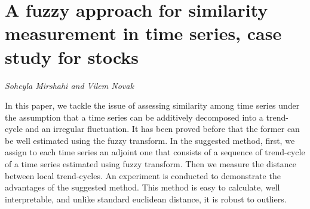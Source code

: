 \documentclass[../booklet.tex]{subfiles}
\begin{document}
\section[A fuzzy approach for similarity measurement in time series, case study for stocks. {\it Soheyla Mirshahi and Vilem Novak}]{A fuzzy approach for similarity measurement in time series, case study for stocks}
 

\begin{center}
  {\it Soheyla Mirshahi and Vilem Novak}
\end{center}

\vskip 0.8cm


 
In this paper, we tackle the issue of assessing similarity among time series under the assumption that a time series can be additively decomposed into a trend-cycle and an irregular fluctuation.  It has been proved before that the former can be well estimated using the fuzzy transform. In the suggested method, first, we assign to each time series an adjoint one that consists of a sequence of trend-cycle of a time series estimated using fuzzy transform. Then we measure the distance between local trend-cycles. An experiment is conducted to demonstrate the advantages of the suggested method. This method is easy to calculate, well interpretable, and unlike standard euclidean distance, it is robust to outliers. 
\end{document}
